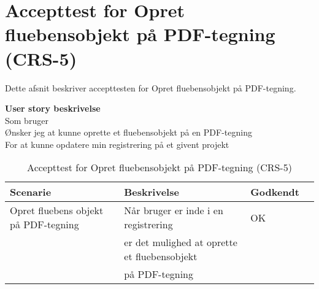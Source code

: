\section{Accepttest for Opret fluebensobjekt på PDF-tegning (CRS-5)}
Dette afsnit beskriver accepttesten for Opret fluebensobjekt på PDF-tegning.

\textbf{User story beskrivelse} \\
Som bruger \\
Ønsker jeg at kunne oprette et fluebensobjekt på en PDF-tegning \\
For at kunne opdatere min registrering på et givent projekt

\begin{table}[H]
	\centering
	\begin{tabular}{|ll|l|ll|} \hline
		\textbf{Scenarie} &  & \textbf{Beskrivelse}&  \textbf{Godkendt}&  \\ \hline
		Opret fluebens objekt på PDF-tegning&  &  Når bruger er inde i en registrering &  OK&  \\
		& & er det mulighed at oprette et fluebensobjekt& & \\ 
		& & på PDF-tegning& & \\ \hline
	\end{tabular}
	\caption{Accepttest for Opret fluebensobjekt på PDF-tegning (CRS-5)}
	\label{AcceptFlueben}
\end{table}